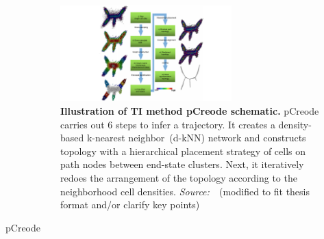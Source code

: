 \begin{description}
\begin{figure}[h!]
  	\centering
  	\includegraphics[width=0.65\textwidth]{TI_Alg_pCreode/fig}
  	\vspace{0.1cm}
  	\caption[Illustration of TI method pCreode schematic.]{\textbf{Illustration of TI method pCreode schematic.} pCreode carries out 6 steps to infer a trajectory. It creates a density-based k-nearest neighbor~(d-kNN) network and constructs topology with a hierarchical placement strategy of cells on path nodes between end-state clusters. Next, it iteratively redoes the arrangement of the topology according to the neighborhood cell densities. \emph{Source:~\cite{herring2018pCreode}}~(modified to fit thesis format and/or clarify key points)
  	}
  	\label{fig:TI_Alg_pCreode}
\end{figure}

  \item[pCreode]


\end{description}

